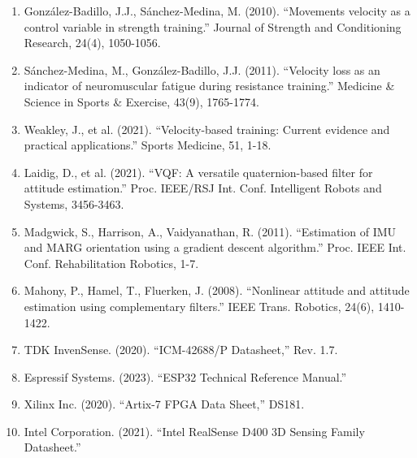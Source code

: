 \begin{enumerate}
    \item González-Badillo, J.J., Sánchez-Medina, M. (2010). ``Movements velocity as a control variable in strength training.'' Journal of Strength and Conditioning Research, 24(4), 1050-1056.

    \item Sánchez-Medina, M., González-Badillo, J.J. (2011). ``Velocity loss as an indicator of neuromuscular fatigue during resistance training.'' Medicine \& Science in Sports \& Exercise, 43(9), 1765-1774.

    \item Weakley, J., et al. (2021). ``Velocity-based training: Current evidence and practical applications.'' Sports Medicine, 51, 1-18.

    \item Laidig, D., et al. (2021). ``VQF: A versatile quaternion-based filter for attitude estimation.'' Proc. IEEE/RSJ Int. Conf. Intelligent Robots and Systems, 3456-3463.

    \item Madgwick, S., Harrison, A., Vaidyanathan, R. (2011). ``Estimation of IMU and MARG orientation using a gradient descent algorithm.'' Proc. IEEE Int. Conf. Rehabilitation Robotics, 1-7.

    \item Mahony, P., Hamel, T., Fluerken, J. (2008). ``Nonlinear attitude and attitude estimation using complementary filters.'' IEEE Trans. Robotics, 24(6), 1410-1422.

    \item TDK InvenSense. (2020). ``ICM-42688/P Datasheet,'' Rev. 1.7.

    \item Espressif Systems. (2023). ``ESP32 Technical Reference Manual.''

    \item Xilinx Inc. (2020). ``Artix-7 FPGA Data Sheet,'' DS181.

    \item Intel Corporation. (2021). ``Intel RealSense D400 3D Sensing Family Datasheet.''
\end{enumerate}

\newpage
